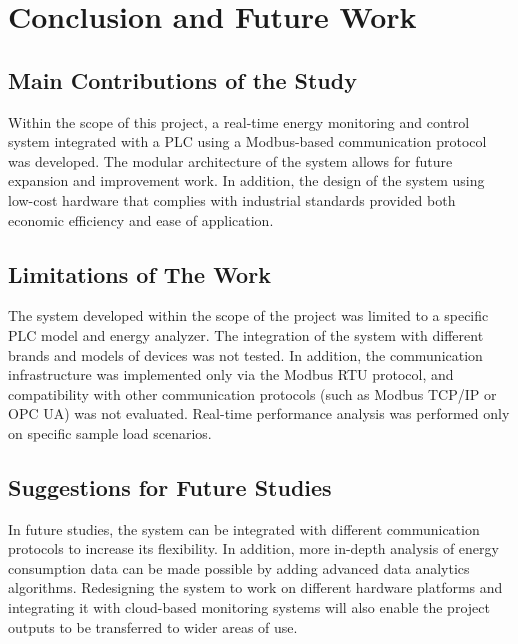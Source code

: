 \doublespacing %

\chapter{Conclusion and Future Work}
\label{ch6}

\begin{spacing}{1} %
\minitoc %
\end{spacing} %
\thesisspacing %



    \section{Main Contributions of the Study}

Within the scope of this project, a real-time energy monitoring and control system integrated with a PLC using a Modbus-based communication protocol was developed. The modular architecture of the system allows for future expansion and improvement work. In addition, the design of the system using low-cost hardware that complies with industrial standards provided both economic efficiency and ease of application.
    \medskip

    \section{Limitations of The Work}

The system developed within the scope of the project was limited to a specific PLC model and energy analyzer. The integration of the system with different brands and models of devices was not tested. In addition, the communication infrastructure was implemented only via the Modbus RTU protocol, and compatibility with other communication protocols (such as Modbus TCP/IP or OPC UA) was not evaluated. Real-time performance analysis was performed only on specific sample load scenarios.    
    \medskip

    \section{Suggestions for Future Studies}

In future studies, the system can be integrated with different communication protocols to increase its flexibility. In addition, more in-depth analysis of energy consumption data can be made possible by adding advanced data analytics algorithms. Redesigning the system to work on different hardware platforms and integrating it with cloud-based monitoring systems will also enable the project outputs to be transferred to wider areas of use.
    \medskip




\clearpage